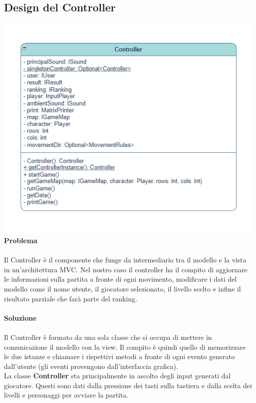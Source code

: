 \documentclass[12pt, letterpaper]{article}
\begin{document}
    \subsection{Design del Controller}
            \includegraphics[width=1\textwidth]{controller.png}
            \textbf{Problema}
            \\ \\
            Il Controller è il componente che funge da intermediario tra il modello e la vista in un'architettura MVC. Nel nostro caso il controller ha il compito di aggiornare le informazioni sulla partita a fronte di ogni movimento, modificare i dati del modello come il nome utente, il giocatore selezionato, il livello scelto e infine il risultato parziale che farà parte del ranking.
            \\ \\
            \textbf{Soluzione}
            \\ \\
            Il Controller è formato da una sola classe che si occupa di mettere in comunicazione il modello con la view. Il compito è quindi quello di memorizzare le due istanze e chiamare i rispettivi metodi a fronte di ogni evento generato dall'utente (gli eventi provengono dall'interfaccia grafica). \\
            La classe \textbf{Controller} sta principalmente in ascolto degli input generati dal giocatore. Questi sono dati dalla pressione dei tasti sulla tastiera e dalla scelta dei livelli e personaggi per avviare la partita.\\
\end{document}
